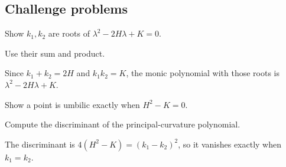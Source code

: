 \subsection*{Challenge problems}

\begin{exercise}\label{exr:vii17-ped-15}
Show \(k_1,k_2\) are roots of \(\lambda^2-2H\lambda+K=0\).
\end{exercise}
\begin{hint}
Use their sum and product.
\end{hint}
\begin{solution}
Since \(k_1+k_2=2H\) and \(k_1k_2=K\), the monic polynomial with those roots is \(\lambda^2-2H\lambda+K\).
\end{solution}

\begin{exercise}\label{exr:vii17-ped-16}
Show a point is umbilic exactly when \(H^2-K=0\).
\end{exercise}
\begin{hint}
Compute the discriminant of the principal-curvature polynomial.
\end{hint}
\begin{solution}
The discriminant is \(4(H^2-K)=(k_1-k_2)^2\), so it vanishes exactly when \(k_1=k_2\).
\end{solution}

